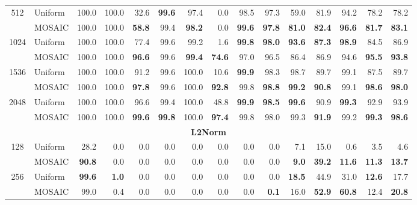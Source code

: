 \begin{table}[tp]
\begin{tabular}{@{} c l rrrrrrrrrrrrr @{}}
    \cmidrule(l){1-15}
    \multirow{2}{*}{512} & Uniform & 100.0 & 100.0 & 32.6 & \textbf{99.6} & 97.4 & 0.0 & 98.5 & 97.3 & 59.0 & 81.9 & 94.2 & 78.2 & 78.2 \\
     & MOSAIC & 100.0 & 100.0 & \textbf{58.8} & 99.4 & \textbf{98.2} & 0.0 & \textbf{99.6} & \textbf{97.8} & \textbf{81.0} & \textbf{82.4} & \textbf{96.6} & \textbf{81.7} & \textbf{83.1} \\
    \cmidrule(l){1-15}
    \multirow{2}{*}{1024} & Uniform & 100.0 & 100.0 & 77.4 & 99.6 & 99.2 & 1.6 & \textbf{99.8} & \textbf{98.0} & \textbf{93.6} & \textbf{87.3} & \textbf{98.9} & 84.5 & 86.9 \\
     & MOSAIC & 100.0 & 100.0 & \textbf{96.6} & 99.6 & \textbf{99.4} & \textbf{74.6} & 97.0 & 96.5 & 86.4 & 86.9 & 94.6 & \textbf{95.5} & \textbf{93.8} \\
    \cmidrule(l){1-15}
    \multirow{2}{*}{1536} & Uniform & 100.0 & 100.0 & 91.2 & 99.6 & 100.0 & 10.6 & \textbf{99.9} & 98.3 & 98.7 & 89.7 & 99.1 & 87.5 & 89.7 \\
     & MOSAIC & 100.0 & 100.0 & \textbf{97.8} & 99.6 & 100.0 & \textbf{92.8} & 99.8 & \textbf{98.8} & \textbf{99.2} & \textbf{90.8} & 99.1 & \textbf{98.6} & \textbf{98.0} \\
    \cmidrule(l){1-15}
    \multirow{2}{*}{2048} & Uniform & 100.0 & 100.0 & 96.6 & 99.4 & 100.0 & 48.8 & \textbf{99.9} & \textbf{98.5} & \textbf{99.6} & 90.9 & \textbf{99.3} & 92.9 & 93.9 \\
     & MOSAIC & 100.0 & 100.0 & \textbf{99.6} & \textbf{99.8} & 100.0 & \textbf{97.4} & 99.8 & 98.0 & 99.3 & \textbf{91.9} & 99.2 & \textbf{99.3} & \textbf{98.6} \\
    \midrule
    \multicolumn{15}{c}{\textbf{L2Norm}} \\
    \midrule
    \multirow{2}{*}{128} & Uniform & 28.2 & 0.0 & 0.0 & 0.0 & 0.0 & 0.0 & 0.0 & 0.0 & 7.1 & 15.0 & 0.6 & 3.5 & 4.6 \\
     & MOSAIC & \textbf{90.8} & 0.0 & 0.0 & 0.0 & 0.0 & 0.0 & 0.0 & 0.0 & \textbf{9.0} & \textbf{39.2} & \textbf{11.6} & \textbf{11.3} & \textbf{13.7} \\
    \cmidrule(l){1-15}
    \multirow{2}{*}{256} & Uniform & \textbf{99.6} & \textbf{1.0} & 0.0 & 0.0 & 0.0 & 0.0 & 0.0 & 0.0 & \textbf{18.5} & 44.9 & 31.0 & \textbf{12.6} & 17.7 \\
     & MOSAIC & 99.0 & 0.4 & 0.0 & 0.0 & 0.0 & 0.0 & 0.0 & \textbf{0.1} & 16.0 & \textbf{52.9} & \textbf{60.8} & 12.4 & \textbf{20.8} \\
    \cmidrule(l){1-15}

\end{tabular}
\end{table}
